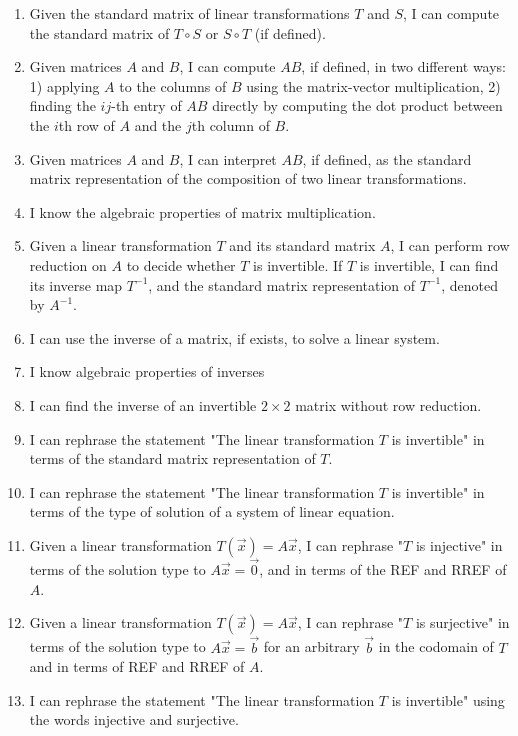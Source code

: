 \documentclass[12pt,oneside,english]{matchapter}
\numberwithin{equation}{section}
\numberwithin{figure}{section}
\begin{document}
\begin{enumerate}
	\item Given the standard matrix of linear transformations $T$ and $S$, I can compute the standard matrix of $T\circ S$ or $S\circ T$ (if defined).
	\item Given matrices $A$ and $B$, I can compute $AB$, if defined, in two different ways: 1) applying $A$ to the columns of $B$ using the matrix-vector multiplication, 2) finding the $ij$-th entry of $AB$ directly by computing the dot product between the $i$th row of $A$ and the $j$th column of $B$. 
	\item Given matrices $A$ and $B$, I can interpret $AB$, if defined, as the standard matrix representation of the composition of two linear transformations. 
	\item I know the algebraic properties of matrix multiplication. 
	\item Given a linear transformation $T$ and its standard matrix $A$, I can perform row reduction on $A$ to decide whether $T$ is invertible. If $T$ is invertible, I can find its inverse map $T^{-1}$, and the standard matrix representation of $T^{-1}$, denoted by $A^{-1}$. 
	\item I can use the inverse of a matrix, if exists, to solve a linear system.
	\item I know algebraic properties of inverses 
	\item I can find the inverse of an invertible $2\times 2 $ matrix without row reduction. 
	\item I can rephrase the statement "The linear transformation $T$ is invertible" in terms of the standard matrix representation of $T$.
	\item I can rephrase the statement "The linear transformation $T$ is invertible" in terms of the type of solution of a system of linear equation. 
	
	\item Given a linear transformation $T(\vec x)=A\vec x$, I can rephrase "$T$ is injective" in terms of the solution type to $A\vec x=\vec 0$, and in terms of the REF and RREF of $A$. \label{inj}
	
	
	\item Given a linear transformation $T(\vec x)=A\vec x$, I can rephrase "$T$ is surjective" in terms of the solution type to $A\vec x=\vec b$ for an arbitrary $\vec b$ in the codomain of $T$ and in terms of REF and RREF of $A$. \label{surj}
	
	
	\item I can rephrase the statement "The linear transformation $T$ is invertible" using the words injective and surjective. \label{invertiobleIII}

	
\end{enumerate}
\end{document}
